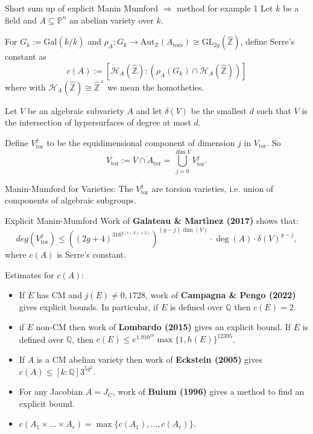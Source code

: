 \documentclass[handout]{beamer}
\begin{document}
\begin{frame}{Short sum up of explicit Manin Mumford $\Longrightarrow$ method for example 1}
Let $k$ be a field and $A \subseteq \mathbb{P}^n$ an abelian variety over $k$.

\pause
\vspace{0.5cm}
For $G_k := \mathrm{Gal}(\overline{k}/k)$ and $\rho_A \colon G_k \to \mathrm{Aut}_\mathbb{Z}(A_\text{tors}) \cong \mathrm{GL}_{2 g}(\widehat{\mathbb{Z}})$, define Serre's constant as 
\begin{equation*} \label{eq:Serre_constant}
	c(A) := [\mathcal{H}_A(\widehat{\mathbb{Z}}) \colon (\rho_A(G_k) \cap \mathcal{H}_A(\widehat{\mathbb{Z}}))]
\end{equation*} where with $\mathcal{H}_A(\widehat{\mathbb{Z}}) \cong \widehat{\mathbb{Z}}^\times$ we mean the homotheties.

\pause
\vspace{0.5cm}
  Let  $V$ be an algebraic subvariety $A$ and let
 $\delta(V)$  be the smallest $d$ such that $V$ is the intersection of hypersurfaces of degree at most $d$. 
 
 Define $V^j_\text{tor}$ to be  the equidimensional component of dimension $j$ in $V_\text{tor}$. So
 $$V_\text{tor} := \overline{V \cap A_{\text{tor}}} = \bigcup_{j=0}^{\dim V} V_{\text{tor}}^j.$$
 
 Manin-Mumford for Varieties: The $V_{\text{tor}}^j$ are torsion varieties, i.e.  union of components of algebraic subgroups. 
\end{frame}


\begin{frame}{ Explicit Manin-Mumford}
 Work of \textbf{Galateau \& Mart\`inez (2017)} shows that:
  $$ deg(V_{\text{tor}}^j) \le ((2g+4)^316^{g (c(A) + 2)})^{(g-j) \dim(V)} \cdot \deg(A) \cdot \delta(V)^{g-j},$$ where $c(A)$ is Serre's constant.

\pause
\vspace{0.5cm}
Estimates for $c(A)$:
\begin{itemize}
\item If $E$ has CM and $j(E) \neq 0,1728$, work of \textbf{Campagna \& Pengo (2022)} gives explicit bounds. \newline In particular, if $E$ is defined over $\mathbb{Q}$ then
 $c(E)= 2$. 
\item if $E$ non-CM then work of \textbf{Lombardo (2015)} gives an explicit bound. \newline If $E$ is defined over $\mathbb{Q}$, then
$c(E) \le e^{1.9 10^{10}} \max\{1,h(E)\}^{12395}$.\pause
\item If $A$ is a CM abelian variety then work of \textbf{Eckstein (2005)} gives  $c(A)\le [k: \mathbb{Q}]3^{5g^2}$. \pause 
\item For any Jacobian  $A=J_C$, work of \textbf{Buium (1996)} gives a method to find an explicit bound. \pause
\item $c(A_1 \times \dots \times A_r) = \max\{c(A_1),\dots,c(A_r)\}$.
\end{itemize}


\end{frame}
\end{document}
